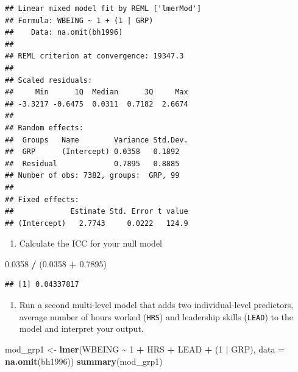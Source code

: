 \documentclass[
]{book}
\newenvironment{Shaded}{\begin{snugshade}}{\end{snugshade}}
\newcommand{\DataTypeTok}[1]{\textcolor[rgb]{0.13,0.29,0.53}{#1}}
\newcommand{\DecValTok}[1]{\textcolor[rgb]{0.00,0.00,0.81}{#1}}
\newcommand{\FloatTok}[1]{\textcolor[rgb]{0.00,0.00,0.81}{#1}}
\newcommand{\KeywordTok}[1]{\textcolor[rgb]{0.13,0.29,0.53}{\textbf{#1}}}
\newcommand{\NormalTok}[1]{#1}
\newcommand{\OperatorTok}[1]{\textcolor[rgb]{0.81,0.36,0.00}{\textbf{#1}}}
\newcommand{\StringTok}[1]{\textcolor[rgb]{0.31,0.60,0.02}{#1}}
\providecommand{\tightlist}{%
  \setlength{\itemsep}{0pt}\setlength{\parskip}{0pt}}
\begin{document}
\begin{alert}
\begin{verbatim}
## Linear mixed model fit by REML ['lmerMod']
## Formula: WBEING ~ 1 + (1 | GRP)
##    Data: na.omit(bh1996)
## 
## REML criterion at convergence: 19347.3
## 
## Scaled residuals: 
##     Min      1Q  Median      3Q     Max 
## -3.3217 -0.6475  0.0311  0.7182  2.6674 
## 
## Random effects:
##  Groups   Name        Variance Std.Dev.
##  GRP      (Intercept) 0.0358   0.1892  
##  Residual             0.7895   0.8885  
## Number of obs: 7382, groups:  GRP, 99
## 
## Fixed effects:
##             Estimate Std. Error t value
## (Intercept)   2.7743     0.0222   124.9
\end{verbatim}

\begin{enumerate}
\def\labelenumi{\arabic{enumi}.}
\setcounter{enumi}{1}
\tightlist
\item
  Calculate the ICC for your null model
\end{enumerate}

\begin{Shaded}
\begin{Highlighting}[]
  \FloatTok{0.0358} \OperatorTok{/}\StringTok{ }\NormalTok{(}\FloatTok{0.0358} \OperatorTok{+}\StringTok{ }\FloatTok{0.7895}\NormalTok{)}
\end{Highlighting}
\end{Shaded}

\begin{verbatim}
## [1] 0.04337817
\end{verbatim}

\begin{enumerate}
\def\labelenumi{\arabic{enumi}.}
\setcounter{enumi}{2}
\tightlist
\item
  Run a second multi-level model that adds two individual-level predictors, average number of hours worked (\texttt{HRS}) and leadership skills (\texttt{LEAD}) to the model and interpret your output.
\end{enumerate}

\begin{Shaded}
\begin{Highlighting}[]
\NormalTok{  mod\_grp1 \textless{}{-}}\StringTok{ }\KeywordTok{lmer}\NormalTok{(WBEING }\OperatorTok{\textasciitilde{}}\StringTok{ }\DecValTok{1} \OperatorTok{+}\StringTok{ }\NormalTok{HRS }\OperatorTok{+}\StringTok{ }\NormalTok{LEAD }\OperatorTok{+}\StringTok{ }\NormalTok{(}\DecValTok{1} \OperatorTok{|}\StringTok{ }\NormalTok{GRP), }\DataTypeTok{data =} \KeywordTok{na.omit}\NormalTok{(bh1996))}
  \KeywordTok{summary}\NormalTok{(mod\_grp1)}
\end{Highlighting}
\end{Shaded}


\end{alert}
\end{document}
